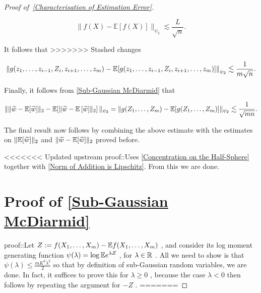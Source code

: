 \documentclass{article}
\begin{document}
\begin{proof}[Proof of~{\autoref{Characterisation of Estimation Error}}]
\begin{lemma}
\begin{equation*}
\lVert f(X)-\mathbb{E}[f(X)]\rVert_{\psi_2} \lesssim \frac{L}{\sqrt{n}}.
\end{equation*}


\end{lemma}
  It follows that
>>>>>>> Stashed changes


\begin{equation*}
\left\|g(z_1, \dots, z_{i-1}, Z_i, z_{i+1}, \dots, z_m) - \mathbb{E}[g(z_1, \dots, z_{i-1}, Z_i, z_{i+1}, \dots, z_m)]\right\|_{\psi_2} \lesssim \frac{1}{m\sqrt{n}}.
\end{equation*}

Finally, it follows from \autoref{Sub-Gaussian McDiarmid} that


\begin{equation*}
\|\| \widetilde{w} - \mathbb{E}[\widetilde{w}]\|_2 - \mathbb{E}[\| \widetilde{w} - \mathbb{E}\left[\widetilde{w}]\|_2\right]\|_{\psi_2}= \|g(Z_1,\dots,Z_m) - \mathbb{E}[g(Z_1,\dots,Z_m)]\|_{\psi_2} \lesssim \frac{1}{\sqrt{mn}}.
\end{equation*}

The final result now follows by combining the above estimate with the estimates on  $\|\mathbb{E}[\widetilde{w}]\|_2$  and  $\|\widetilde{w} - \mathbb{E}[\widetilde{w}]\|_2$  proved before.


<<<<<<< Updated upstream
proof::Uses \autoref{Concentration on the Half-Sphere} together with \autoref{Norm of Addition is Lipschitz}. From this we are done.



\section{Proof of \autoref{Sub-Gaussian McDiarmid}}
\label{section:Proof of \autoref{Sub-Gaussian McDiarmid}}
proof::Let  $Z := f(X_1, \dots, X_m) - \mathbb{E} f(X_1, \dots, X_m)$ , and consider its log moment generating function  $\psi(\lambda) = \log \mathbb{E} e^{\lambda Z}$ , for  $\lambda \in \mathbb{R}$ . All we need to show is that  $\psi(\lambda) \leq \frac{mK^2\lambda^2}{2}$  so that by definition of sub-Gaussian random variables, we are done. In fact, it suffices to prove this for  $\lambda \geq 0$ , because the case  $\lambda < 0$  then follows by repeating the argument for  $-Z$ .
=======
\end{proof}
 
\end{document}
